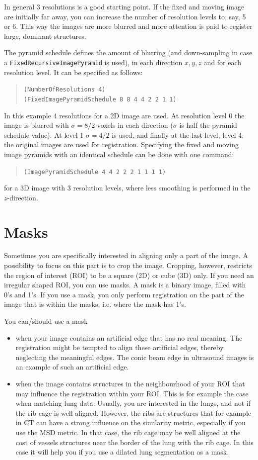 \documentclass[]{report}
\begin{document}
In general 3 resolutions is a good starting point. If the fixed and
moving image are initially far away, you can increase the number of
resolution levels to, say, 5 or 6. This way the images are more
blurred and more attention is paid to register large, dominant
structures.

The pyramid schedule defines the amount of blurring (and
down-sampling in case a \texttt{FixedRecursiveImagePyramid} is used),
in each direction $x,y,z$ and for each resolution level. It can be
specified as follows:
\begin{quote}
\texttt{(NumberOfResolutions 4)} \\
\texttt{(FixedImagePyramidSchedule 8 8 4 4 2 2 1 1)}
\end{quote}
In this example 4 resolutions for a 2D image are used. At
resolution level 0 the image is blurred with $\sigma = 8/2$ voxels
in each direction ($\sigma$ is half the pyramid schedule value).
At level 1 $\sigma = 4/2$ is used, and finally at the last level,
level 4, the original images are used for registration. Specifying
the fixed and moving image pyramids with an identical schedule can
be done with one command:
\begin{quote}
\texttt{(ImagePyramidSchedule 4 4 2 2 2 1 1 1 1)}
\end{quote}
for a 3D image with 3 resolution levels, where less smoothing is
performed in the $z$-direction.

\section{Masks}

Sometimes you are specifically interested in aligning only a part of
the image. A possibility to focus on this part is to crop the image.
Cropping, however, restricts the region of interest (ROI) to be a
square (2D) or cube (3D) only. If you need an irregular shaped ROI,
you can use masks. A mask is a binary image, filled with 0's and 1's.
If you use a mask, you only perform registration on the part of the
image that is within the masks, i.e. where the mask has 1's.

You can/should use a mask
\begin{itemize}
\item when your image contains an artificial edge that has no real meaning.
The registration might be tempted to align these artificial edges,
thereby neglecting the meaningful edges. The conic beam edge in
ultrasound images is an example of such an artificial edge.

\item when the image contains structures in the neighbourhood
of your ROI that may influence the registration within your ROI.
This is for example the case when matching lung data. Usually, you
are interested in the lungs, and not if the rib cage is well
aligned. However, the ribs are structures that for example in CT can
have a strong influence on the similarity metric, especially if you
use the MSD metric. In that case, the rib cage may be well aligned
at the cost of vessels structures near the border of the lung with
the rib cage. In this case it will help you if you use a dilated
lung segmentation as a mask.
\end{itemize}
\end{document}
